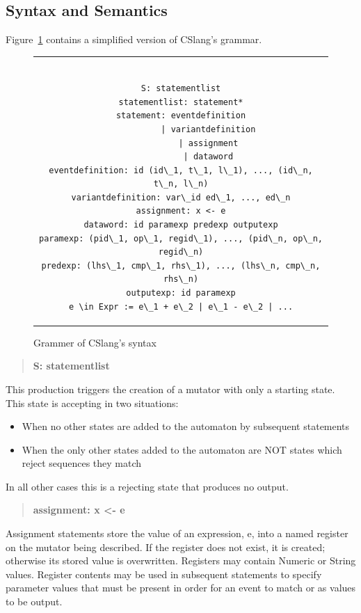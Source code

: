 \subsection{Syntax and Semantics}
\label{sub:SyntaxAndSemantics}

Figure~\ref{lst:SyntaxGrammar} contains a simplified
version of CSlang's grammar.

\begin{figure}[H]
\centering
\begin{tabular}{c}
\begin{lstlisting}

S: statementlist
statementlist: statement*
statement: eventdefinition
           | variantdefinition
           | assignment
           | dataword
eventdefinition: id (id\_1, t\_1, l\_1), ..., (id\_n, t\_n, l\_n)
variantdefinition: var\_id ed\_1, ..., ed\_n
assignment: x <- e
dataword: id paramexp predexp outputexp
paramexp: (pid\_1, op\_1, regid\_1), ..., (pid\_n, op\_n, regid\_n)
predexp: (lhs\_1, cmp\_1, rhs\_1), ..., (lhs\_n, cmp\_n, rhs\_n)
outputexp: id paramexp
e \in Expr := e\_1 + e\_2 | e\_1 - e\_2 | ...
\end{lstlisting}
\end{tabular}
\caption{Grammer of CSlang's syntax}
\label{lst:SyntaxGrammar}
\end{figure}


\begin{quote}
\centering
\textbf{S: statementlist}
\end{quote}

This production triggers the creation of a mutator with only a starting
state.  This state is accepting in two situations:
\begin{itemize}
  \item{When no other states are added to the automaton by subsequent
    statements}
  \item{When the only other states added to the automaton are NOT states
    which reject sequences they match}
\end{itemize}
In all other cases this is a rejecting state that produces no output.

\begin{quote}
\centering
\textbf{assignment: x <- e}
\end{quote}

Assignment statements store the value of an expression, e, into a named
register on the mutator being described.
If the register does not exist,
it is created;
otherwise its stored value is overwritten.
Registers may contain Numeric or String values.  Register contents
may be used in subsequent statements to specify parameter values that must
be present in order for an event to match or as values to be output.

